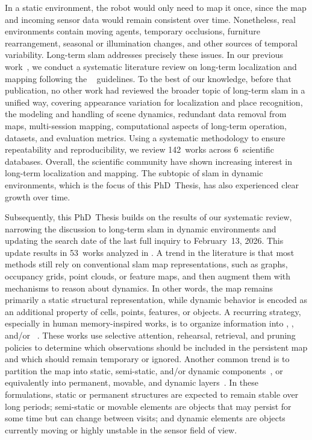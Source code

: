 In a static environment, the robot would only need to map it once,
since the map and incoming sensor data would remain consistent over time.
Nonetheless, real environments contain moving agents, temporary occlusions,
furniture rearrangement, seasonal or illumination changes,
and other sources of temporal variability.
Long-term \gls{slam} addresses precisely these issues.
In our previous work~\cite{sousa:jfr:2023}, we conduct a systematic literature
review on long-term localization and mapping following
the ~\cite{page:bmj:2021} guidelines.
To the best of our knowledge,
before that publication, no other work had reviewed the broader topic of
long-term \gls{slam} in a unified way, covering appearance variation
for localization and place recognition, the modeling and handling of
scene dynamics, redundant data removal from maps, multi-session mapping,
computational aspects of long-term operation, datasets, and evaluation metrics.
Using a systematic methodology to ensure repeatability and reproducibility,
we review 142~works across 6~scientific databases.
Overall, the scientific community have shown increasing interest in
long-term localization and mapping.
The subtopic of \gls{slam} in dynamic environments, which is the focus of
this PhD~Thesis, has also experienced clear growth over time.

Subsequently, this PhD~Thesis builds on the results of our systematic review,
narrowing the discussion to long-term \gls{slam} in dynamic environments
and updating the search date of the last full inquiry to February~13, 2026. This
update results in 53~works analyzed in .
A trend in the literature is that most methods
still rely on conventional \gls{slam} map representations, such as graphs,
occupancy grids, point clouds, or feature maps, and then augment them
with mechanisms to reason about dynamics. In other words, the map remains
primarily a static structural representation, while dynamic behavior is encoded
as an additional property of cells, points, features, or objects.
A recurring strategy, especially in human memory-inspired works,
is to organize information into ,
, and/or
~\cite{dayoub:ras:2011,bacca:ras:2013,biber-duckett:ijrr:2009,xing:jfr:2022,biswas-veloso:ras:2017}.
These works use selective attention, rehearsal, retrieval,
and pruning policies to determine which observations should be included
in the persistent map and which should remain temporary or ignored. Another
common trend is to partition the map into static, semi-static, and/or dynamic
components~\cite{walcott-bryant:iros:2012,zhang:acc:2019,ganti-waslander:crv:2019,zhu:icra:2021,guo-liu:robio:2021,deng:ram:2023,wang:ras:2024,li:tim:2025},
or equivalently into permanent, movable, and dynamic
layers~\cite{bescos:ral:2018,wang:icra:2019,soares:jint:2023}. In these formulations, static or permanent structures are expected to remain stable over long periods; semi-static or movable elements are objects that may persist for some time but can change between visits; and dynamic elements are objects currently moving or highly unstable in the sensor field of view.

